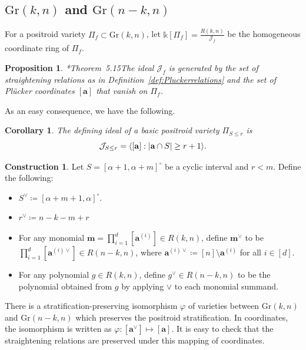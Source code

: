\documentclass[12pt,reqno]{amsart}
\newtheorem{prop}[lemma]{Proposition}
\newtheorem{cor}[lemma]{Corollary}
\theoremstyle{definition}
\newtheorem{construction}[lemma]{Construction}
\renewcommand{\aa}{\mathbf a}
\newcommand{\mm}{\mathbf m}
\renewcommand{\k}{\mathbb{k}}
\newcommand{\cJ}{\mathcal{J}}
\DeclarePairedDelimiter\abs{\lvert}{\rvert}%
\newcommand{\gr}{\mathrm{Gr}}
\begin{document}
{\subsection{\texorpdfstring{$\gr(k,n)$}{Gr(k,n)} and \texorpdfstring{$\gr(n-k,n)$}{Gr(k,n)}}
For a positroid variety $\Pi_f\subset \gr(k,n)$, let 
$\displaystyle \k[\Pi_f] = \frac{R(k,n)}{\cJ_f}$ be the homogeneous coordinate ring of $\Pi_f$.

\begin{prop}\cite{KLS13juggling}*{Theorem~5.15}\label{prop:vanishplucker}
The ideal $\cJ_f$ 
is generated by the set of straightening relations as in Definition~\ref{def:Pluckerrelations} and the set of Pl\"ucker coordinates $[\aa]$ that vanish on $\Pi_f$.
\end{prop}

As an easy consequence, we have the following.
\begin{cor}\label{cor:vanishplucker}
    The defining ideal of a basic positroid variety $\Pi_{S\leq r}$ is
    \[\cJ_{S\leq r} = \langle [\aa]:\abs{\aa\cap S}\geq r+1\rangle.\]
\end{cor}

\begin{construction}\label{const: complement-interval}
Let $S = [\alpha+1,\alpha+m]^\circ$ be a cyclic interval and $r<m$. 
Define the following:
\begin{itemize}
    \item $S^\vee \coloneqq [\alpha+m+1,\alpha]^\circ$.
    \item $r^\vee \coloneqq n-k-m+r$
    \item For any monomial $\mm = \prod_{i = 1}^d [\mathbf{a}^{(i)}]\in R(k,n)$, define $\mm^\vee$ to be $\prod_{i = 1}^d [\mathbf{a}^{(i)\vee}]\in R(n-k,n)$, where $\mathbf{a}^{(i)\vee} \coloneqq [n]\setminus \mathbf{a}^{(i)}$ for all $i\in [d]$.
    \item For any polynomial $g \in R(k,n)$, define $g^\vee \in R(n-k,n)$ to be the polynomial obtained from $g$ by applying $\vee$ to each monomial summand.
\end{itemize}
There is a stratification-preserving isomorphism $\varphi$ of varieties between $\gr(k,n)$ and $\gr(n-k,n)$ which preserves the positroid stratification. In coordinates, the isomorphism is written as $\varphi:[\mathbf{a}^\vee]\mapsto [\mathbf{a}]$. It is easy to check that the straightening relations are preserved under this mapping of coordinates.
\end{construction}



}
\end{document}
